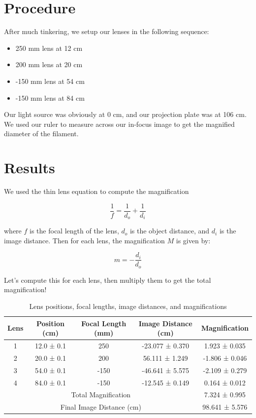 \documentclass[12pt,letterpaper]{article}
\begin{document}
\section{Procedure}

After much tinkering, we setup our lenses in the following sequence:

\begin{itemize}
    \item 250 mm lens at 12 cm
    \item 200 mm lens at 20 cm
    \item -150 mm lens at 54 cm
    \item -150 mm lens at 84 cm
\end{itemize}

Our light source was obviously at 0 cm, and our projection plate was at 106 cm. We used our ruler to measure across our in-focus image to get the magnified diameter of the filament.

\section{Results}

We used the thin lens equation to compute the magnification

\begin{equation}
\frac{1}{f} = \frac{1}{d_o} + \frac{1}{d_i}
\end{equation}

where $f$ is the focal length of the lens, $d_o$ is the object distance, and $d_i$ is the image distance. Then for each lens, the magnification $M$ is given by:

\begin{equation}
m = -\frac{d_i}{d_o}
\end{equation}

Let's compute this for each lens, then multiply them to get the total magnification!

\begin{table}[h]
\centering
\begin{tabular}{|c|c|c|c|c|}
\hline
Lens & Position (cm) & Focal Length (mm) & Image Distance (cm) & Magnification \\
\hline
1 & 12.0 ± 0.1 & 250 & -23.077 ± 0.370 & 1.923 ± 0.035 \\
2 & 20.0 ± 0.1 & 200 & 56.111 ± 1.249 & -1.806 ± 0.046 \\
3 & 54.0 ± 0.1 & -150 & -46.641 ± 5.575 & -2.109 ± 0.279 \\
4 & 84.0 ± 0.1 & -150 & -12.545 ± 0.149 & 0.164 ± 0.012 \\

\hline
\multicolumn{4}{|c|}{Total Magnification} & 7.324 ± 0.995 \\

\hline
\multicolumn{4}{|c|}{Final Image Distance (cm)} & 98.641 ± 5.576 \\

\hline
\end{tabular}
\caption{Lens positions, focal lengths, image distances, and magnifications}
\label{tab:lens_system}
\end{table}
\end{document}
